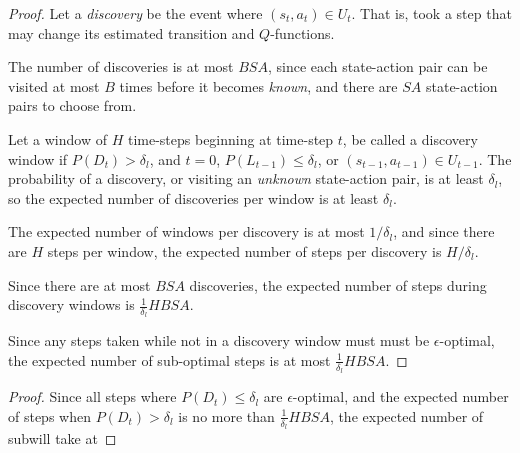 \begin{proof}
Let a \emph{discovery} be the event where $(s_t,a_t) \in U_t$. That is, \A took a step that may change its estimated transition and $Q$-functions.

The number of discoveries is at most $B S A$, since each state-action pair can be visited at most $B$ times before it becomes \emph{known}, and there are $S A$ state-action pairs to choose from.

Let a window of $H$ time-steps beginning at time-step $t$, be called a discovery window if $P(D_t) > \delta_l$, and $t=0$, $P(L_{t-1}) \leq \delta_l$, or $(s_{t-1},a_{t-1}) \in U_{t-1}$. The probability of a discovery, or visiting an \emph{unknown} state-action pair, is at least $\delta_l$, so the expected number of discoveries per window is at least $\delta_l$.

The expected number of windows per discovery is at most $1/\delta_l$, and since there are $H$ steps per window, the expected number of steps per discovery is $H / \delta_l$.

Since there are at most $B S A$ discoveries, the expected number of steps during discovery windows is $\frac 1 {\delta_l} H B S A$.

Since any steps taken while not in a discovery window must must be $\epsilon$-optimal, the expected number of sub-optimal steps is at most $\frac 1 {\delta_l} H B S A$.

\end{proof}

\begin{proof}

Since all steps where $P(D_t) \leq \delta_l$ are $\epsilon$-optimal, and the expected number of steps when $P(D_t)>\delta_l$ is no more than $\frac 1 {\delta_l} H B S A$, the expected number of sub\A will take at 

\end{proof}